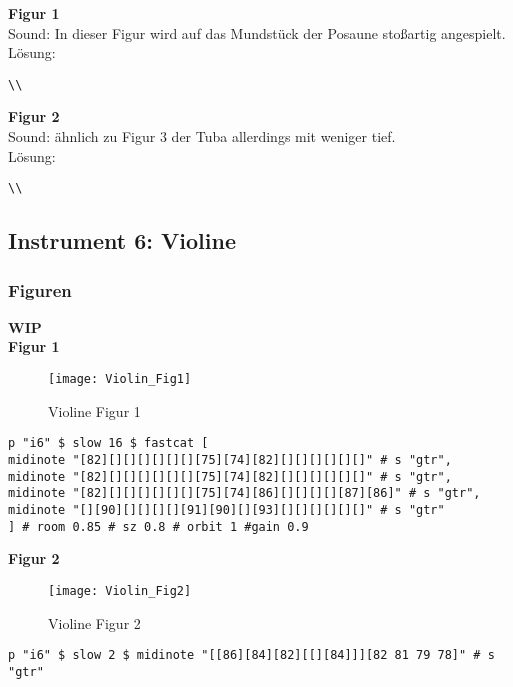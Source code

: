 \documentclass[
10pt, %
a4paper, %
oneside, %
headinclude,footinclude, %
BCOR5mm, %
]{scrartcl}
\begin{document}
\noindent\textbf{Figur 1}\\
 Sound: In dieser Figur wird auf das Mundstück der Posaune stoßartig angespielt.\\
Lösung:\\
\begin{lstlisting}
\\
\end{lstlisting}

\noindent\textbf{Figur 2}\\
Sound: ähnlich zu Figur 3 der Tuba allerdings mit weniger tief.\\
Lösung:\\
\begin{lstlisting}
\\
\end{lstlisting}

\subsection{Instrument 6: Violine}
\subsubsection{Figuren}
{\color{orange}\textbf{WIP}} \\
\noindent\textbf{Figur 1}\\
\begin{figure}[h]
	\centering 
	\texttt{[image: Violin\_Fig1]} 
	\caption{Violine Figur 1}
\end{figure}

\begin{lstlisting}
p "i6" $ slow 16 $ fastcat [
midinote "[82][][][][][][][75][74][82][][][][][][]" # s "gtr",
midinote "[82][][][][][][][75][74][82][][][][][][]" # s "gtr",
midinote "[82][][][][][][][75][74][86][][][][][87][86]" # s "gtr",
midinote "[][90][][][][][91][90][][93][][][][][][]" # s "gtr"
] # room 0.85 # sz 0.8 # orbit 1 #gain 0.9
\end{lstlisting}

\noindent\textbf{Figur 2}\\
\begin{figure}[h]
	\centering 
	\texttt{[image: Violin\_Fig2]} 
	\caption{Violine Figur 2}
\end{figure}

\begin{lstlisting}
p "i6" $ slow 2 $ midinote "[[86][84][82][[][84]]][82 81 79 78]" # s "gtr"
\end{lstlisting}
\end{document}
